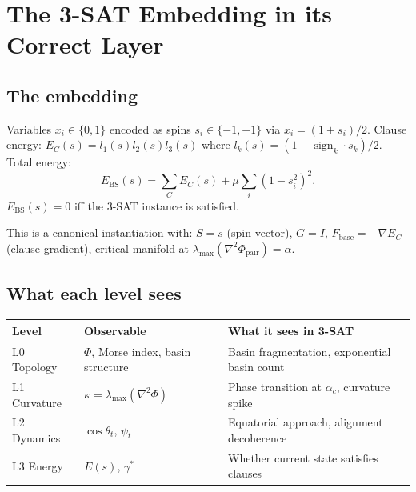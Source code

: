 \documentclass[11pt,a4paper]{article}
\theoremstyle{definition}
\newcommand{\Fbase}{F_{\mathrm{base}}}
\begin{document}
\section{The 3-SAT Embedding in its Correct Layer}
\label{sec:3sat}

\subsection{The embedding}

Variables $x_i\in\{0,1\}$ encoded as spins $s_i\in\{-1,+1\}$ via $x_i=(1+s_i)/2$.
Clause energy: $E_C(s) = l_1(s)l_2(s)l_3(s)$ where
$l_k(s) = (1-\operatorname{sign}_k\cdot s_k)/2$.
Total energy:
\[
E_\mathrm{BS}(s) = \sum_C E_C(s) + \mu\sum_i(1-s_i^2)^2.
\]
$E_\mathrm{BS}(s) = 0$ iff the 3-SAT instance is satisfied.

This is a canonical instantiation with:
$S = s$ (spin vector), $G = I$, $\Fbase = -\nabla E_C$ (clause gradient),
critical manifold at $\lambda_\mathrm{max}(\nabla^2\Phi_\mathrm{pair}) = \alpha$.

\subsection{What each level sees}

\begin{center}
\renewcommand{\arraystretch}{1.3}
\begin{tabular}{lll}
\toprule
\textbf{Level} & \textbf{Observable} & \textbf{What it sees in 3-SAT} \\
\midrule
L0 Topology & $\Phi$, Morse index, basin structure & Basin fragmentation, exponential basin count \\
L1 Curvature & $\kappa = \lambda_\mathrm{max}(\nabla^2\Phi)$ & Phase transition at $\alpha_c$, curvature spike \\
L2 Dynamics & $\cos\theta_t$, $\psi_t$ & Equatorial approach, alignment decoherence \\
L3 Energy & $E(s)$, $\gamma^*$ & Whether current state satisfies clauses \\
\bottomrule
\end{tabular}
\end{center}
\end{document}
